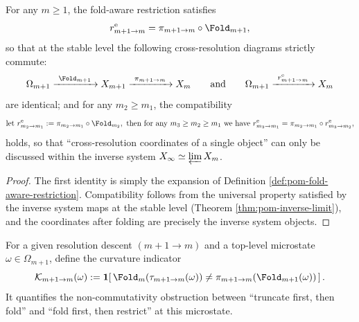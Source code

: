 \begin{proposition}\label{prop:pom-gauge-natural}
For any $m\ge 1$, the fold-aware restriction satisfies
$$
r^{\mathrm{e}}_{m+1\to m}
=
\pi_{m+1\to m}\circ \Fold_{m+1},
$$
so that at the stable level the following cross-resolution diagrams strictly commute:
$$
\Omega_{m+1}\xrightarrow{\ \Fold_{m+1}\ }X_{m+1}\xrightarrow{\ \pi_{m+1\to m}\ }X_m
\qquad\text{and}\qquad
\Omega_{m+1}\xrightarrow{\ r^{\mathrm{e}}_{m+1\to m}\ }X_m
$$
are identical; and for any $m_2\ge m_1$, the compatibility
$$
\text{let }r^{\mathrm{e}}_{m_2\to m_1}:=\pi_{m_2\to m_1}\circ\Fold_{m_2},
\ \text{then for any }m_3\ge m_2\ge m_1\text{ we have }r^{\mathrm{e}}_{m_3\to m_1}=\pi_{m_2\to m_1}\circ r^{\mathrm{e}}_{m_3\to m_2},
$$
holds, so that ``cross-resolution coordinates of a single object'' can only be discussed within the inverse system $X_\infty\simeq\varprojlim X_m$.
\end{proposition}
\begin{proof}
The first identity is simply the expansion of Definition \ref{def:pom-fold-aware-restriction}. Compatibility follows from the universal property satisfied by the inverse system maps at the stable level (Theorem \ref{thm:pom-inverse-limit}), and the coordinates after folding are precisely the inverse system objects.
\end{proof}

\begin{definition}\label{def:pom-gauge-curvature}
For a given resolution descent \((m{+}1\to m)\) and a top-level microstate \(\omega\in\Omega_{m+1}\), define the curvature indicator
\[
\mathcal{K}_{m+1\to m}(\omega)
:=
\mathbf 1\!\left[\,
\Fold_m(\tau_{m+1\to m}(\omega))
\neq
\pi_{m+1\to m}(\Fold_{m+1}(\omega))
\,\right].
\]
It quantifies the non-commutativity obstruction between ``truncate first, then fold'' and ``fold first, then restrict'' at this microstate.
\end{definition}


